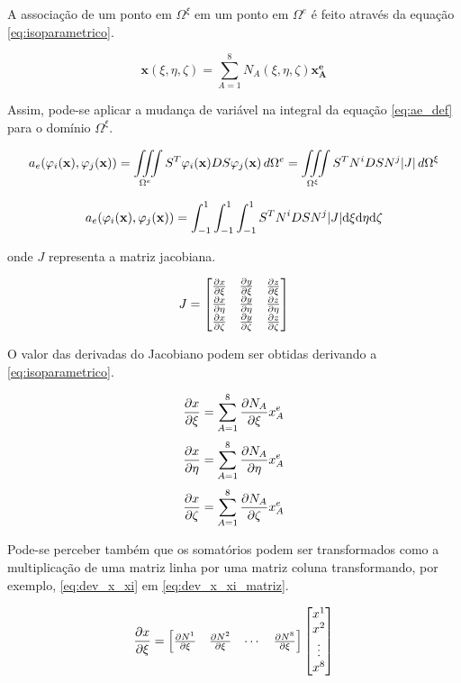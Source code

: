 A associação de um ponto em $\Omega^\xi$ em um ponto em $\Omega^e$ é feito através da equação \ref{eq:isoparametrico}.


\begin{equation}
\label{eq:isoparametrico}
\mathbf{x}(\xi, \eta, \zeta) = \sum_{A=1}^{8} N_A(\xi, \eta, \zeta) \mathbf{x^e_A} 
\end{equation}

Assim, pode-se aplicar a mudança de variável na integral da equação \ref{eq:ae_def} para o domínio $\Omega^\xi$.

\begin{equation} 
 a_e(\phiix,\phijx) = \omeeint{S^T\phiix D S\phijx} = \omeint[\Omega^\xi]{S^T N^i D S N^j |J|}
\end{equation}


\begin{equation} 
 a_e(\phiix,\phijx) = \int^1_ {-1}\int^1_ {-1}\int^1_ {-1}{S^T N^i D S N^j |J|} \text{d}\xi \text{d}\eta \text{d}\zeta
\end{equation}

onde $J$ representa a matriz jacobiana. 

\begin{equation}
J = \begin{bmatrix}
\dxi[x]   &   \dxi[y] &   \dxi[z] \\
\deta[x]  &  \deta[y] &  \deta[z] \\
\dzeta[x] & \dzeta[y] & \dzeta[z] 
\end{bmatrix}
\label{eq:jacobiano}
\end{equation}

O valor das derivadas do Jacobiano podem ser obtidas derivando a \ref{eq:isoparametrico}.


\begin{equation}\label{eq:dev_x_xi}
\dxi[x] = \sum^8_{A=1} \dxi[N_A] x^e_A
\end{equation}
\begin{equation}
\deta[x] = \sum^8_{A=1} \deta[N_A] x^e_A
\end{equation}
\begin{equation}
\dzeta[x] = \sum^8_{A=1} \dzeta[N_A] x^e_A
\end{equation}



Pode-se perceber também que os somatórios podem ser transformados como a multiplicação de uma matriz linha por uma matriz coluna transformando, por exemplo, \ref{eq:dev_x_xi} em \ref{eq:dev_x_xi_matriz}.

\begin{equation}\label{eq:dev_x_xi_matriz}
\dxi[x] = 
\begin{bmatrix}
 \dxi[N^1]   & \dxi[N^2] & \cdots & \dxi[N^8]
\end{bmatrix}
\begin{bmatrix}
x^1    \\ 
x^2    \\ 
\vdots  \\ 
x^8  
\end{bmatrix}
\end{equation}


